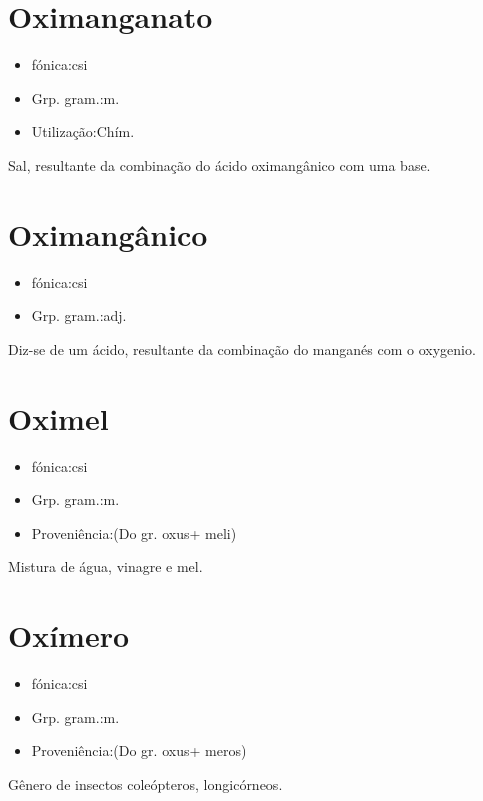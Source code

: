 \section{Oximanganato}
\begin{itemize}
\item {fónica:csi}
\end{itemize}
\begin{itemize}
\item {Grp. gram.:m.}
\end{itemize}
\begin{itemize}
\item {Utilização:Chím.}
\end{itemize}
Sal, resultante da combinação do ácido oximangânico com uma base.
\section{Oximangânico}
\begin{itemize}
\item {fónica:csi}
\end{itemize}
\begin{itemize}
\item {Grp. gram.:adj.}
\end{itemize}
Diz-se de um ácido, resultante da combinação do manganés com o oxygenio.
\section{Oximel}
\begin{itemize}
\item {fónica:csi}
\end{itemize}
\begin{itemize}
\item {Grp. gram.:m.}
\end{itemize}
\begin{itemize}
\item {Proveniência:(Do gr. \textunderscore oxus\textunderscore  + \textunderscore meli\textunderscore )}
\end{itemize}
Mistura de água, vinagre e mel.
\section{Oxímero}
\begin{itemize}
\item {fónica:csi}
\end{itemize}
\begin{itemize}
\item {Grp. gram.:m.}
\end{itemize}
\begin{itemize}
\item {Proveniência:(Do gr. \textunderscore oxus\textunderscore  + \textunderscore meros\textunderscore )}
\end{itemize}
Gênero de insectos coleópteros, longicórneos.
